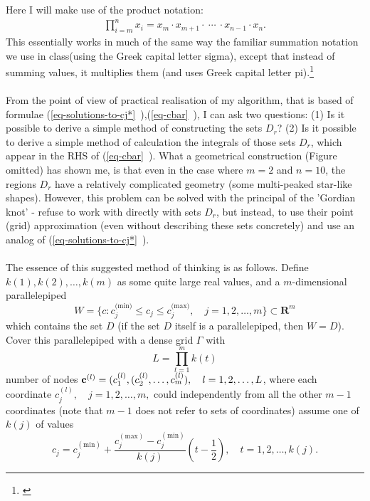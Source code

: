 Here I will make use of the product notation:
\begin{gather*}
\prod\limits_{i = m}^{n} x_{i} = x_{m} \cdot x_{m+1} \cdot \  \cdots \  \cdot x_{n-1} \cdot x_{n}.
\end{gather*}
This essentially works in much of the same way the familiar summation notation we use in class(using the Greek capital letter sigma), except that instead of summing values, it multiplies them (and uses Greek capital letter pi).\footnote{\cite{product_1995}}\\
\\
From the point of view of practical realisation of my algorithm, that is based of formulae (\vref{eq-solutions-to-cj*}~),(\vref{eq-cbar}~), I can ask two questions: (1) Is it possible to derive a simple method of constructing the sets $D_{r}$? (2) Is it possible to derive a simple method of calculation the integrals of those sets $D_{r}$, which appear in the RHS of (\vref{eq-cbar}~). What a geometrical construction (Figure omitted) has shown me, is that even in the case where $m=2$ and $n=10$, the regions $D_{r}$ have a relatively complicated geometry (some multi-peaked star-like shapes). However, this problem can be solved with the principal of the 'Gordian knot' - refuse to work with directly with sets $D_{r}$, but instead, to use their point (grid) approximation (even without describing these sets concretely) and use an analog of (\vref{eq-solutions-to-cj*}~).\\
\\
The essence of this suggested method of thinking is as follows. Define $k(1),k(2),\dots,k(m)$ as some quite large real values, and a $m$-dimensional parallelepiped
\begin{equation}
W=\{ c:c_{j}^{(\text{min)}} \leq c_{j} \leq c_{j}^{(\text{max)}}, \quad j=1,2,\dots,m \}\subset \boldsymbol{R}^{m}
\end{equation}
which contains the set $D$ (if the set $D$ itself is a parallelepiped, then $W=D$). Cover this parallelepiped with a dense grid $\Gamma$ with
\begin{equation}
L = \prod\limits_{t=1}^{m}k(t)
\end{equation}
number of nodes $\textbf{c}^{(l)} = (c_{1}^{(l)},(c_{2}^{(l)},\dots,c_{m}^{(l)}),\quad l=1,2,\dots,L$, where each coordinate $c_{j}^{(l)}, \quad j=1,2,\dots,m,$ could independently from all the other $m-1$ coordinates (note that $m-1$ does not refer to sets of coordinates) assume one of $k(j)$ of values
\begin{equation}
c_{j}=c_{j}^{(\text{min})} + \frac{c_{j}^{(\text{max})}-c_{j}^{(\text{min})}}{k(j)}(t-\frac{1}{2}), \quad t=1,2,\dots,k(j).
\end{equation}
